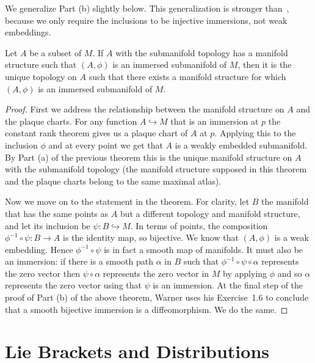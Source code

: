 We generalize Part (b) slightly below.
This generalization is stronger than~\cite[Lem~2.1.41]{Sharpe1997}, because we only require the inclusions to be injective immersions, not weak embeddings.

\begin{theorem}
\label{thm:unique manifold structure}
Let $A$ be a subset of $M$. 
If $A$ with the submanifold topology has a manifold structure such that $(A,\phi)$ is an immersed submanifold of $M$, then it is the unique topology on $A$ such that there exists a manifold structure for which $(A,\phi)$ is an immersed submanifold of $M$.
\end{theorem}
\begin{proof}
First we address the relationship between the manifold structure on $A$ and the plaque charts.
For any function $A \hookrightarrow M$ that is an immersion at $p$ the constant rank theorem gives us a plaque chart of $A$ at $p$.
Applying this to the inclusion $\phi$ and at every point we get that $A$ is a weakly embedded submanifold.
By Part (a) of the previous theorem this is the unique manifold structure on $A$ with the submanifold topology (the manifold structure supposed in this theorem and the plaque charts belong to the same maximal atlas).

Now we move on to the statement in the theorem.
For clarity, let $B$ the manifold that has the same points as $A$ but a different topology and manifold structure, and let its inclusion be $\psi : B \hookrightarrow M$.
In terms of points, the composition $\phi^{-1} \circ \psi : B \to A$ is the identity map, so bijective.
We know that $(A,\phi)$ is a weak embedding.
Hence $\phi^{-1} \circ \psi$ is in fact a smooth map of manifolds.
It must also be an immersion: if there is a smooth path $\alpha$ in $B$ such that $\phi^{-1} \circ \psi \circ \alpha$ represents the zero vector then $\psi \circ \alpha$ represents the zero vector in $M$ by applying $\phi$ and so $\alpha$ represents the zero vector using that $\psi$ is an immersion. 
At the final step of the proof of Part (b) of the above theorem, Warner uses his Exercise~1.6 to conclude that a smooth bijective immersion is a diffeomorphism.
We do the same.
\end{proof}


\section{Lie Brackets and Distributions}


